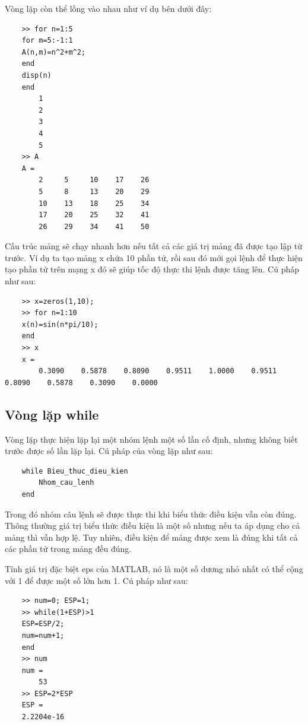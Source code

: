 \documentclass[12pt,a4paper]{article}
\begin{document}
Vòng lặp  còn thể lồng vào nhau như ví dụ bên dưới đây:
\begin{lstlisting}
	>> for n=1:5
	for m=5:-1:1
	A(n,m)=n^2+m^2;
	end
	disp(n)
	end
     	1
     	2
     	3
     	4
     	5
	>> A
	A =
     	2     5     10    17    26
     	5     8     13    20    29
    	10    13    18    25    34
    	17    20    25    32    41
    	26    29    34    41    50
\end{lstlisting}
Cấu trúc mảng  sẽ chạy nhanh hơn nếu tất cả các giá trị mảng đã được tạo lập từ trước. Ví dụ ta tạo mảng x chứa 10 phần tử, rồi sau đó mới gọi lệnh  để thực hiện tạo phần tử trên mạng x đó sẽ giúp tốc độ thực thi lệnh được tăng lên. Cú pháp như sau:
\begin{lstlisting}
	>> x=zeros(1,10);
	>> for n=1:10
	x(n)=sin(n*pi/10);
	end
	>> x
	x =
    	0.3090    0.5878    0.8090    0.9511    1.0000    0.9511    0.8090    0.5878    0.3090    0.0000
\end{lstlisting}
\subsection{Vòng lặp while}
Vòng lặp  thực hiện lặp lại một nhóm lệnh một số lần cố định, nhưng không biết trước được số lần lặp lại. Cú pháp của vòng lặp  như sau:
\begin{lstlisting}
	while Bieu_thuc_dieu_kien
		Nhom_cau_lenh
	end
\end{lstlisting}
Trong đó nhóm câu lệnh sẽ được thực thi khi biểu thức điều kiện vẫn còn đúng. Thông thường giá trị biểu thức điều kiện là một số nhưng nếu ta áp dụng cho cả mảng thì vẫn hợp lệ. Tuy nhiên, điều kiện để mảng được xem là đúng khi tất cả các phần tử trong mảng đều đúng.
\begin{example}
Tính giá trị đặc biệt eps của MATLAB, nó là một số dương nhỏ nhất có thể cộng với 1 để được một số lớn hơn 1. Cú pháp như sau:
\begin{lstlisting}
	>> num=0; ESP=1;
	>> while(1+ESP)>1
	ESP=ESP/2;
	num=num+1;
	end
	>> num
	num =
    	53
	>> ESP=2*ESP
	ESP =
   	2.2204e-16
\end{lstlisting}	
\end{example}
\end{document}
